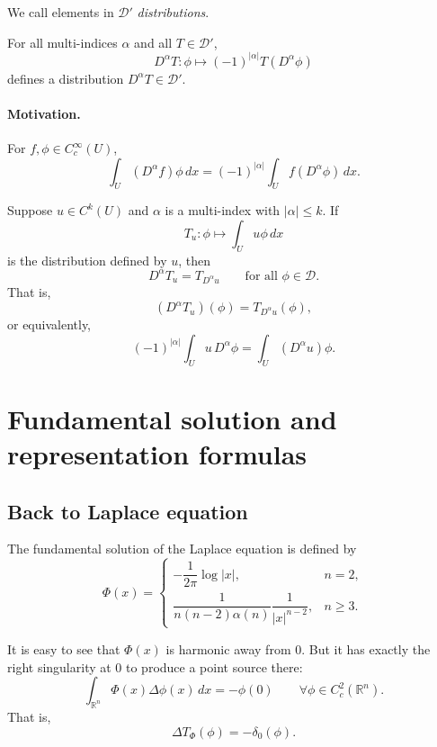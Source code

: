 \begin{definition}
We call elements in $\mathcal{D}'$ \emph{distributions}.
\end{definition}

\begin{proposition}
For all multi-indices $\alpha$ and all $T\in \mathcal{D}'$,
$$
D^\alpha T:\phi\mapsto (-1)^{|\alpha|}T(D^\alpha \phi)
$$
defines a distribution $D^\alpha T\in \mathcal{D}'$.
\end{proposition}

\paragraph{Motivation.}
For $f,\phi\in C_c^\infty(U)$,
$$
\int_U (D^\alpha f)\phi\,dx
=
(-1)^{|\alpha|}
\int_U f(D^\alpha \phi)\,dx.
$$

\begin{proposition}
Suppose $u\in C^k(U)$ and $\alpha$ is a multi-index with $|\alpha|\le k$.
If
$$
T_u:\phi\mapsto \int_U u\phi\,dx
$$
is the distribution defined by $u$, then
$$
D^\alpha T_u = T_{D^\alpha u}
\qquad \text{for all } \phi\in \mathcal{D}.
$$
That is,
$$
(D^\alpha T_u)(\phi)=T_{D^\alpha u}(\phi),
$$
or equivalently,
$$
(-1)^{|\alpha|}\int_U u\,D^\alpha \phi
=
\int_U (D^\alpha u)\phi.
$$
\end{proposition}

\section{Fundamental solution and representation formulas}

\subsection*{Back to Laplace equation}

\begin{definition}
The fundamental solution of the Laplace equation is defined by
$$
\Phi(x)=
\begin{cases}
-\dfrac{1}{2\pi}\log|x|, & n=2,\\[1em]
\dfrac{1}{n(n-2)\alpha(n)}\dfrac{1}{|x|^{n-2}}, & n\ge 3.
\end{cases}
$$
\end{definition}

\begin{proposition}
It is easy to see that $\Phi(x)$ is harmonic away from $0$.
But it has exactly the right singularity at $0$ to produce a point source there:
$$
\int_{\mathbb{R}^n}\Phi(x)\Delta \phi(x)\,dx
=
-\phi(0)
\qquad \forall \phi\in C_c^2(\mathbb{R}^n).
$$
That is,
$$
\Delta T_\Phi(\phi)=-\delta_0(\phi).
$$
\end{proposition}

